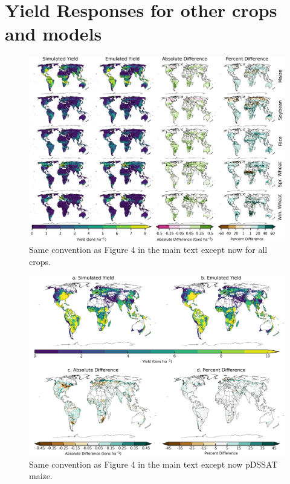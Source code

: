 \documentclass[10pt]{article}
\begin{document}
\section{Yield Responses for other crops and models}
\begin{figure}[h!]
\includegraphics[width=\textwidth]{lpjml_grid.png}
\caption{Same convention as Figure 4 in the main text except now for all crops.}
\label{fig:lpjmlrice}
\end{figure}

\begin{figure}[h!]
\includegraphics[width=\textwidth]{pdssat_maize.png}
\caption{Same convention as Figure 4 in the main text except now pDSSAT maize.}
\label{fig:lpjmlrice}
\end{figure}
\end{document}
